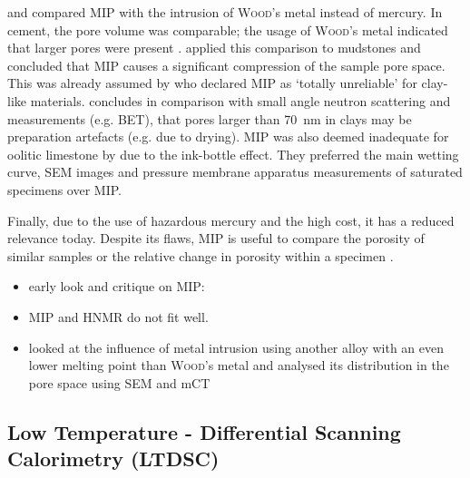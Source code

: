 \textcite{abell.1999} and \textcite{hildenbrand.2003} compared \ac{MIP} with the intrusion of \textsc{Wood}'s metal instead of mercury.
In cement, the pore volume was comparable; the usage of \textsc{Wood}'s metal indicated that larger pores were present \cite{abell.1999}.
\textcite{hildenbrand.2003} applied this comparison to mudstones and concluded that \ac{MIP} causes a significant compression of the sample pore space.
This was already assumed by \cite{horseman.1996} who declared \ac{MIP} as `totally unreliable' for clay-like materials.
\textcite{hall.1986} concludes in comparison with small angle neutron scattering and  measurements (e.g. \ac{BET}), that pores larger than \qty{70}{\nano\meter} in clays may be preparation artefacts (e.g. due to drying).
\ac{MIP} was also deemed inadequate for oolitic limestone by \textcite{roels.2001} due to the ink-bottle effect.
They preferred the main wetting curve, \ac{SEM} images and pressure membrane apparatus measurements of saturated specimens over \ac{MIP}.

Finally, due to the use of hazardous mercury and the high cost, it has a reduced relevance today.
Despite its flaws, \ac{MIP} is useful to compare the porosity of similar samples or the relative change in porosity within a specimen \cite{juntgen.1966}.

{\color{red}
\begin{itemize}
	\item early look and critique on MIP: 
	\item \ac{MIP} and \ac{HNMR} do not fit well. \cite{tziotziou.2011}
	\item \textcite{qian.2018} looked at the influence of metal intrusion using another alloy with an even lower melting point than \textsc{Wood}'s metal and analysed its distribution in the pore space using \ac{SEM} and \ac{mCT}
\end{itemize}
}





\FloatBarrier
\subsection{Low Temperature - Differential Scanning Calorimetry (\acs*{LTDSC})}

